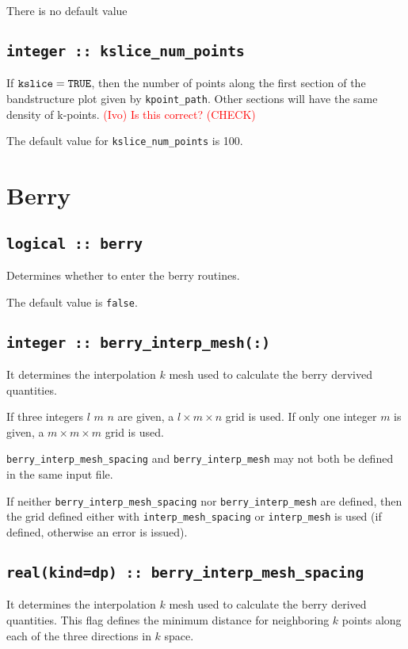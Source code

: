 There is no default value

\subsection[kslice\_num\_points]{\tt integer :: kslice\_num\_points}

If $\verb#kslice#=\verb#TRUE#$, then the number of points along
the first section of the bandstructure plot given by
\verb#kpoint_path#. Other sections will have the same density of
k-points. \textcolor{red}{(Ivo) Is this correct? (CHECK)}

The default value for \verb#kslice_num_points# is 100.


\clearpage
\section{Berry}

\subsection[berry]{\tt logical :: berry}
Determines whether to enter the berry routines.

The default value is \verb#false#.

\subsection[berry\_interp\_mesh]{\tt integer :: berry\_interp\_mesh(:)}
It determines the interpolation $k$ mesh used to calculate the berry
dervived quantities.

If three integers $l$ $m$ $n$ are given, a $l\times m\times n$ grid is used. If only one integer $m$ is given, a $m\times m\times m$ grid is used.

{\tt berry\_interp\_mesh\_spacing} and  {\tt berry\_interp\_mesh} may not both be defined in the same input file.

If neither {\tt berry\_interp\_mesh\_spacing} nor  {\tt berry\_interp\_mesh} are defined, then the grid defined either with {\tt interp\_mesh\_spacing} or {\tt interp\_mesh} is used (if defined, otherwise an error is issued).

\subsection[berry\_interp\_mesh\_spacing]{\tt real(kind=dp) :: berry\_interp\_mesh\_spacing}
It determines the interpolation $k$ mesh used to calculate the berry
derived quantities. This flag
defines the minimum distance for neighboring $k$ points along each of
the three directions in $k$ space. 


